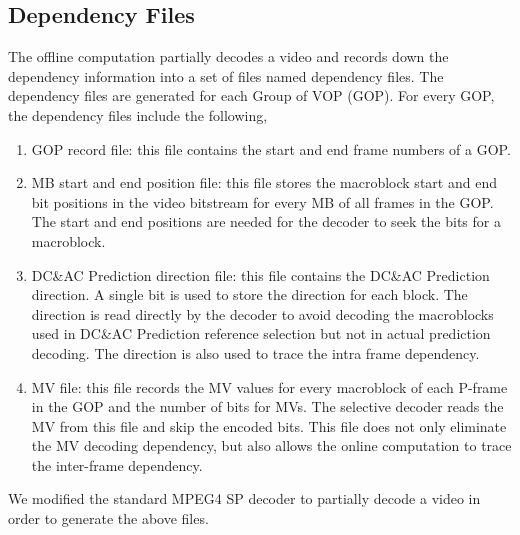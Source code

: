 \subsection{Dependency Files}
The offline computation partially decodes a video and records down the dependency information into a set of files named dependency files. The dependency files are generated for each Group of VOP (GOP). For every GOP, the dependency files include the following,
\begin{enumerate}
\item GOP record file: this file contains the start and end frame numbers of a GOP. 
\item MB start and end position file: this file stores the macroblock start and end bit positions in the video bitstream for every MB of all frames in the GOP. The start and end positions are needed for the decoder to seek the bits for a macroblock. 
\item DC\&AC Prediction direction file: this file contains the DC\&AC Prediction direction. A single bit is used to store the direction for each block. The direction is read directly by the decoder to avoid decoding the macroblocks used in DC\&AC Prediction reference selection but not in actual prediction decoding. The direction is also used to trace the intra frame dependency.  
\item MV file: this file records the MV values for every macroblock of each P-frame in the GOP and the number of bits for MVs. The selective decoder reads the MV from this file and skip the encoded bits. This file does not only eliminate the MV decoding dependency, but also allows the online computation to trace the inter-frame dependency.
\end{enumerate}
We modified the standard MPEG4 SP decoder to partially decode a video in order to generate the above files. 

 



